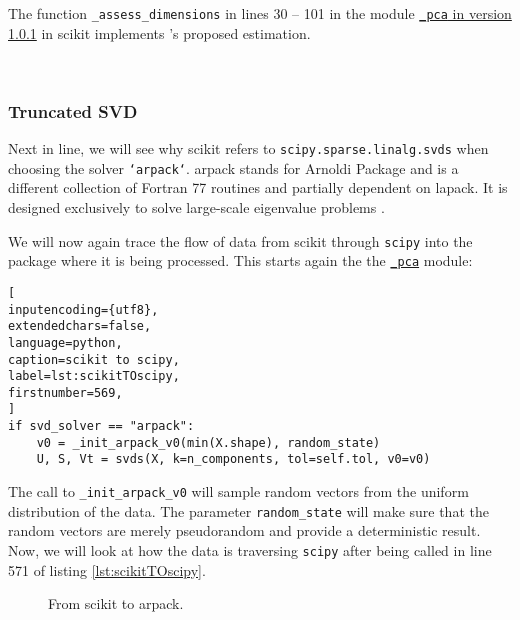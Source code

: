 \bigskip
The function \texttt{\_assess\_dimensions} in lines 30 -- 101 in the module \href{\scikitPCAvIxOxI{_pca}}{\texttt{\_pca} in version 1.0.1} in \gls{scikit} implements \citeauthor{minka2000automatic}'s proposed estimation.



\ \clearpage


\subsubsection{Truncated SVD}

Next in line, we will see why \gls{scikit} refers to \texttt{scipy.sparse.linalg.svds} when choosing the solver \texttt{`arpack`}. 
\acrshort{arpack} stands for Arnoldi Package and is a different collection of Fortran 77 routines and partially dependent on \acrshort{lapack}.
It is designed exclusively to solve large-scale eigenvalue problems \cite{lehoucq1998arpack}.
\medskip


We will now again trace the flow of data from \gls{scikit} through \texttt{scipy} into the package where it is being processed.
This starts again the the \href{\scikitPCAvIxOxI{_pca}}{\texttt{\_pca}} module:

\begin{lstlisting}[
inputencoding={utf8}, 
extendedchars=false, 
language=python, 
caption=scikit to scipy, 
label=lst:scikitTOscipy,
firstnumber=569,
]
if svd_solver == "arpack":
    v0 = _init_arpack_v0(min(X.shape), random_state)
    U, S, Vt = svds(X, k=n_components, tol=self.tol, v0=v0)
\end{lstlisting}

\noindent
The call to \texttt{\_init\_arpack\_v0} will sample random vectors from the uniform distribution of the data.
The parameter \texttt{random\_state} will make sure that the random vectors are merely pseudorandom and provide a deterministic result.
Now, we will look at how the data is traversing \texttt{scipy} after being called in line 571 of listing \ref{lst:scikitTOscipy}.
\bigskip

\renewcommand{\tikzscale}{0.65}
\begin{figure}[h]
	\centering
	
	\captionsetup{justification=centering}
	\vspace*{5mm}
	\caption{From scikit to \acrshort{arpack}.}
	\label{fig:scikitToARPACK}
\end{figure}
\bigskip


